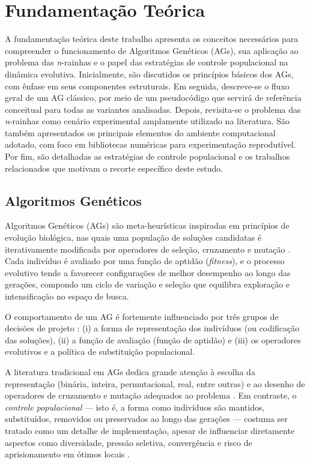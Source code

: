 \section{Fundamentação Teórica}
\label{sec:fundamentacao}

A fundamentação teórica deste trabalho apresenta os conceitos necessários para compreender o funcionamento de Algoritmos Genéticos (AGs), sua aplicação ao problema das \textit{n}-rainhas e o papel das estratégias de controle populacional na dinâmica evolutiva. Inicialmente, são discutidos os princípios básicos dos AGs, com ênfase em seus componentes estruturais. Em seguida, descreve-se o fluxo geral de um AG clássico, por meio de um pseudocódigo que servirá de referência conceitual para todas as variantes analisadas. Depois, revisita-se o problema das \textit{n}-rainhas como cenário experimental amplamente utilizado na literatura. São também apresentados os principais elementos do ambiente computacional adotado, com foco em bibliotecas numéricas para experimentação reprodutível. Por fim, são detalhadas as estratégias de controle populacional e os trabalhos relacionados que motivam o recorte específico deste estudo.

\subsection{Algoritmos Genéticos}

Algoritmos Genéticos (AGs) são meta-heurísticas inspiradas em princípios de evolução biológica, nas quais uma população de soluções candidatas é iterativamente modificada por operadores de seleção, cruzamento e mutação \cite{eiben2015introduction, holland1975adaptation}. Cada indivíduo é avaliado por uma função de aptidão (\textit{fitness}), e o processo evolutivo tende a favorecer configurações de melhor desempenho ao longo das gerações, compondo um ciclo de variação e seleção que equilibra exploração e intensificação no espaço de busca.

O comportamento de um AG é fortemente influenciado por três grupos de decisões de projeto \cite{lacerda1999introducao}:  
(i) a forma de representação dos indivíduos (ou codificação das soluções),  
(ii) a função de avaliação (função de aptidão) e  
(iii) os operadores evolutivos e a política de substituição populacional.  

A literatura tradicional em AGs dedica grande atenção à escolha da representação (binária, inteira, permutacional, real, entre outras) e ao desenho de operadores de cruzamento e mutação adequados ao problema \cite{goldberg1989genetic,eiben2015introduction}. Em contraste, o \textit{controle populacional} — isto é, a forma como indivíduos são mantidos, substituídos, removidos ou preservados ao longo das gerações — costuma ser tratado como um detalhe de implementação, apesar de influenciar diretamente aspectos como diversidade, pressão seletiva, convergência e risco de aprisionamento em ótimos locais \cite{whitley1994tutorial,mitchell1998introduction}.  

